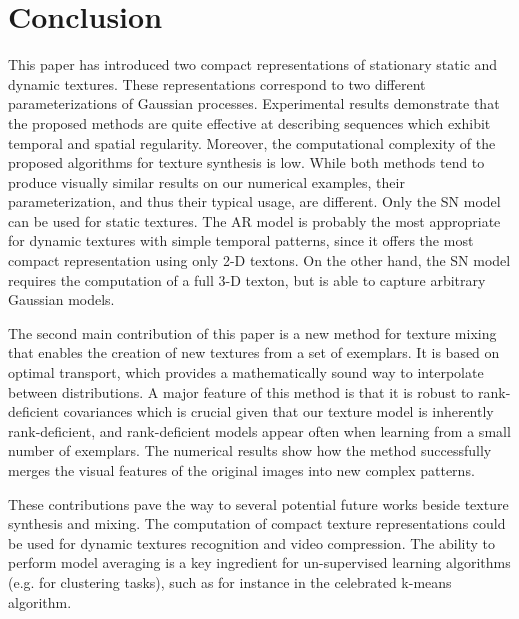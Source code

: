 \section{Conclusion}


This paper has introduced two compact representations of stationary static and dynamic textures. These representations correspond to two different parameterizations of Gaussian processes. Experimental results demonstrate that the proposed methods are quite effective at describing sequences which exhibit temporal and spatial regularity. Moreover, the computational complexity of the proposed algorithms for texture synthesis is low. While both methods tend to produce visually similar results on our numerical examples, their parameterization, and thus their typical usage, are different. Only the SN model can be used for static textures. The AR model is probably the most appropriate for dynamic textures with simple temporal patterns, since it offers the most compact representation using only 2-D textons. On the other hand, the SN model requires the computation of a full 3-D texton, but is able to capture arbitrary Gaussian models. 

The second main contribution of this paper is a new method for texture mixing that enables the creation of new textures from a set of exemplars. It is based on optimal transport, which provides a mathematically sound way to interpolate between distributions. A major feature of this method is that it is robust to rank-deficient covariances which is crucial given that our texture model is inherently rank-deficient, and rank-deficient models appear often when learning from a small number of exemplars. The numerical results show how the method successfully merges the visual features of the original images into new complex patterns. 

These contributions 
pave the way to
 several potential future works beside texture synthesis and mixing. The computation of compact texture representations could be used for dynamic textures recognition and video compression. The ability to perform model averaging is a key ingredient for un-supervised learning algorithms (e.g. for clustering tasks), such as for instance in the celebrated k-means algorithm. 

